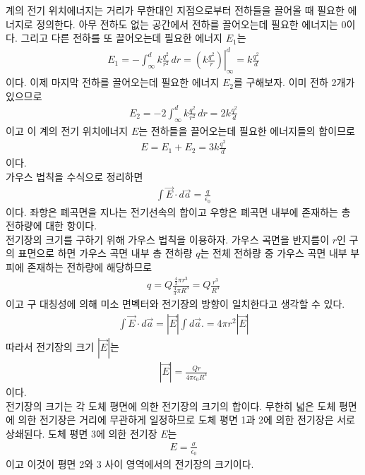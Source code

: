 \documentclass[tightenlines,floatfix,nofootinbib,superscriptaddress,fleqn]{revtex4}
\begin{document}
계의 전기 위치에너지는 거리가 무한대인 지점으로부터 전하들을 끌어올 때 필요한 에너지로 
정의한다. 아무 전하도 없는 공간에서 전하를 끌어오는데 필요한 에너지는 $0$이다. 그리고 다른 
전하를 또 끌어오는데 필요한 에너지 $E_1$는
\begin{align}
  E_1 = -\int _\infty^d k\frac{q^2}{r^2}\,dr 
  = \left.\left(k\frac{q^2}{r}\right)\right| _\infty^d = k\frac{q^2}{d}
\end{align}
이다. 이제 마지막 전하를 끌어오는데 필요한 에너지 $E_2$를 구해보자. 이미 전하 2개가 있으므로
\begin{align}
  E_2 = -2\int _\infty^d k\frac{q^2}{r^2}\,dr  = 2k\frac{q^2}{d}
\end{align}
이고 이 계의 전기 위치에너지 $E$는 전하들을 끌어오는데 필요한 에너지들의 합이므로
\begin{align}
  E=E_1+E_2 = 3k\frac{q^2}{d}
\end{align}
이다.
\\

가우스 법칙을 수식으로 정리하면
\begin{align}
  \int \vec{E}\cdot d\vec{a} =\frac{q}{\epsilon_0}
\end{align}
이다. 좌항은 폐곡면을 지나는 전기선속의 합이고 우항은 폐곡면 내부에 존재하는 총 전하량에 대한
항이다.
\\

전기장의 크기를 구하기 위해 가우스 법칙을 이용하자. 가우스 곡면을 반지름이 $r$인 구의 표면으로
하면 가우스 곡면 내부 총 전하량 $q$는 전체 전하량 중 가우스 곡면 내부 부피에 존재하는 전하량에
해당하므로
\begin{align}
 q = Q\frac{\frac{4}{3}\pi r^3}{\frac{4}{3}\pi R^3}=Q\frac{r^3}{R^3}
\end{align}
이고 구 대칭성에 의해 미소 면벡터와 전기장의 방향이 일치한다고 생각할 수 있다. 
\begin{align}
  \int \vec{E}\cdot d\vec{a} = \left|\vec{E}\right|\int d\vec{a}.
  =4\pi r^2\left|\vec{E}\right|
\end{align}
따라서 전기장의 크기 $\left|\vec{E}\right|$는
\begin{align}
  \left|\vec{E}\right| = \frac{Qr}{4\pi \epsilon_0 R^3}
\end{align}
이다.
\\

전기장의 크기는 각 도체 평면에 의한 전기장의 크기의 합이다. 무한히 넓은 도체 평면에 의한
전기장은 거리에 무관하게 일정하므로 도체 평면 1과 2에 의한 전기장은 서로 상쇄된다. 도체 평면
3에 의한 전기장 $E$는
\begin{align}
  E = \frac{\sigma}{\epsilon_0}
\end{align}
이고 이것이 평면 2와 3 사이 영역에서의 전기장의 크기이다.
\\
\end{document}
